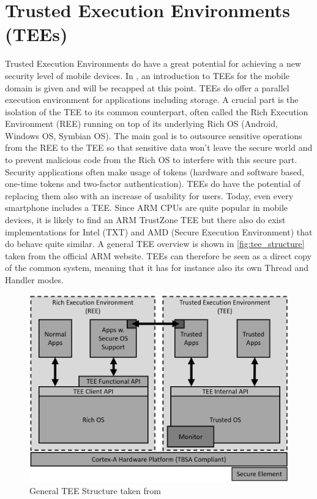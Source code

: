 \chapter{Trusted Execution Environments (TEEs)}\label{chapter:tee}

Trusted Execution Environments do have a great potential for achieving a new
security level of mobile devices. In \parencite{mobile_tee}, an introduction
to TEEs for the mobile domain is given and will be recapped at this point.
TEEs do offer a parallel execution environment for applications including storage. A crucial part is the isolation of the TEE to its common counterpart, often called the Rich Execution Environment (REE) running on top of its underlying Rich OS (Android, Windows OS, Symbian OS). The main goal is to outsource sensitive operations from the REE to the TEE so that sensitive data won't leave
the secure world and to prevent malicious code from the Rich OS to interfere with this secure part. Security applications often make usage of tokens (hardware
and software based, one-time tokens and two-factor authentication).
TEEs do have the potential of replacing them also with an increase of usability
for users.
Today, even every smartphone includes a TEE. Since ARM CPUs are quite popular in mobile devices, it is likely to find an ARM TrustZone TEE but there also do exist implementations for Intel (TXT) and AMD (Secure Execution Environment) that do behave quite similar.
A general TEE overview is shown in \autoref{fig:tee_structure} taken from the
official ARM website. TEEs can therefore be seen as a direct copy of the common
system, meaning that it has for instance also its own Thread and Handler modes.
\begin{figure}[htb]
  \centering
  \includegraphics[scale=0.5]{figures/TEE_structure}
  \caption[General TEE Structure]{General TEE Structure taken from \parencite{tee_dev}}
  \label{fig:tee_structure}
\end{figure}
